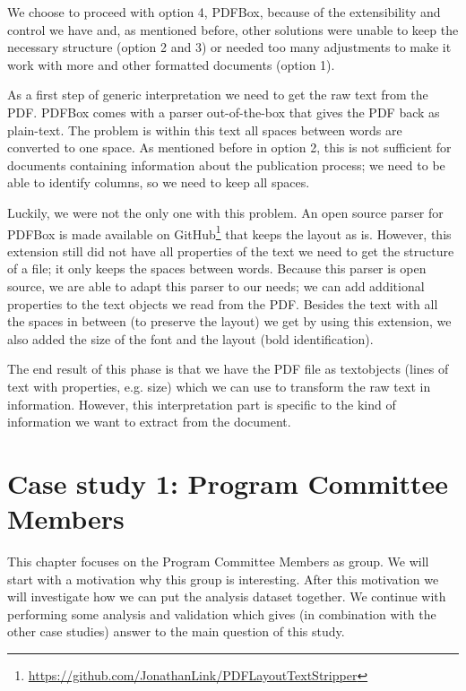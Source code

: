 \documentclass{ou-report}
\begin{document}
We choose to proceed with option 4, PDFBox, because of the extensibility and
control we have and, as mentioned before, other solutions were unable to keep
the necessary structure (option 2 and 3) or needed too many adjustments to make
it work with more and other formatted documents (option 1).

As a first step of generic interpretation we need to get the raw text from 
the PDF. PDFBox comes with a parser out-of-the-box that gives the PDF back as
plain-text. The problem is within this text all spaces between words are
converted to one space. As mentioned before in option 2, this is not sufficient
for documents containing information about the publication process; we need to
be able to identify columns, so we need to keep all spaces.

Luckily, we were not the only one with this problem. An open source parser for
PDFBox is made available on
GitHub\footnote{\url{https://github.com/JonathanLink/PDFLayoutTextStripper}}
that keeps the layout as is. However, this extension still did not have all
properties of the text we need to get the structure of a file; it only keeps the
spaces between words. 
%
Because this parser is open source, we are able to adapt this parser to our 
needs; we can add additional properties to the text objects we read from the 
PDF. Besides the text with all the spaces in between (to preserve the layout) we
get by using this extension, we also added the size of the font and the layout
(bold identification).

The end result of this phase is that we have the PDF file as textobjects (lines 
of text with properties, e.g. size) which we can use to transform the raw text 
in information.
%
However, this interpretation part is specific to the kind of information we 
want to extract from the document.




\chapter{Case study 1: Program Committee Members}
\label{chp:case1}
This chapter focuses on the Program Committee Members as group. We will start 
with a motivation why this group is interesting. After this motivation we will
investigate how we can put the analysis dataset together. We continue with
performing some analysis and validation which gives (in combination with the
other case studies) answer to the main question of this study.
\end{document}
